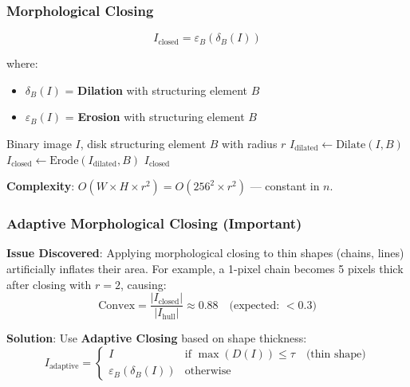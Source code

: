 \documentclass[11pt]{article}
\begin{document}
\subsubsection{Morphological Closing}
\begin{equation}
    I_{\text{closed}} = \varepsilon_B(\delta_B(I))
\end{equation}

where:
\begin{itemize}
    \item $\delta_B(I)$ = \textbf{Dilation} with structuring element $B$
    \item $\varepsilon_B(I)$ = \textbf{Erosion} with structuring element $B$
\end{itemize}

\begin{algorithm}[H]
\caption{Morphological Closing}
\begin{algorithmic}[1]
\Require Binary image $I$, disk structuring element $B$ with radius $r$
\State $I_{\text{dilated}} \gets \text{Dilate}(I, B)$ 
\State $I_{\text{closed}} \gets \text{Erode}(I_{\text{dilated}}, B)$ 
\State \Return $I_{\text{closed}}$
\end{algorithmic}
\end{algorithm}

\textbf{Complexity}: $O(W \times H \times r^2) = O(256^2 \times r^2)$ — constant in $n$.

\subsubsection{Adaptive Morphological Closing (Important)}

\textbf{Issue Discovered}: Applying morphological closing to thin shapes (chains, lines) artificially inflates their area. For example, a 1-pixel chain becomes 5 pixels thick after closing with $r=2$, causing:
\begin{equation}
    \text{Convex} = \frac{|I_{\text{closed}}|}{|I_{\text{hull}}|} \approx 0.88 \quad \text{(expected: } <0.3 \text{)}
\end{equation}

\textbf{Solution}: Use \textbf{Adaptive Closing} based on shape thickness:
\begin{equation}
    I_{\text{adaptive}} = \begin{cases}
        I & \text{if } \max(D(I)) \leq \tau \quad \text{(thin shape)} \\
        \varepsilon_B(\delta_B(I)) & \text{otherwise}
    \end{cases}
\end{equation}
\end{document}
